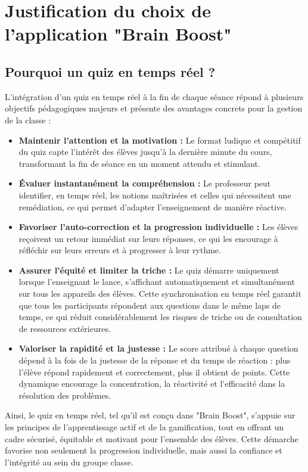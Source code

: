 \documentclass[a4paper,11pt]{report}
\begin{document}
\section{Justification du choix de l'application "Brain Boost"}

\subsection{Pourquoi un quiz en temps réel ?}
L'intégration d'un quiz en temps réel à la fin de chaque séance répond à plusieurs objectifs pédagogiques majeurs et présente des avantages concrets pour la gestion de la classe :
\begin{itemize}
    \item \textbf{Maintenir l'attention et la motivation :} Le format ludique et compétitif du quiz capte l'intérêt des élèves jusqu'à la dernière minute du cours, transformant la fin de séance en un moment attendu et stimulant.
    \item \textbf{Évaluer instantanément la compréhension :} Le professeur peut identifier, en temps réel, les notions maîtrisées et celles qui nécessitent une remédiation, ce qui permet d'adapter l'enseignement de manière réactive.
    \item \textbf{Favoriser l'auto-correction et la progression individuelle :} Les élèves reçoivent un retour immédiat sur leurs réponses, ce qui les encourage à réfléchir sur leurs erreurs et à progresser à leur rythme.
    \item \textbf{Assurer l'équité et limiter la triche :} Le quiz démarre uniquement lorsque l'enseignant le lance, s'affichant automatiquement et simultanément sur tous les appareils des élèves. Cette synchronisation en temps réel garantit que tous les participants répondent aux questions dans le même laps de temps, ce qui réduit considérablement les risques de triche ou de consultation de ressources extérieures.
    \item \textbf{Valoriser la rapidité et la justesse :} Le score attribué à chaque question dépend à la fois de la justesse de la réponse et du temps de réaction : plus l'élève répond rapidement et correctement, plus il obtient de points. Cette dynamique encourage la concentration, la réactivité et l'efficacité dans la résolution des problèmes.
\end{itemize}
Ainsi, le quiz en temps réel, tel qu'il est conçu dans "Brain Boost", s'appuie sur les principes de l'apprentissage actif et de la gamification, tout en offrant un cadre sécurisé, équitable et motivant pour l'ensemble des élèves. Cette démarche favorise non seulement la progression individuelle, mais aussi la confiance et l'intégrité au sein du groupe classe.
\end{document}
